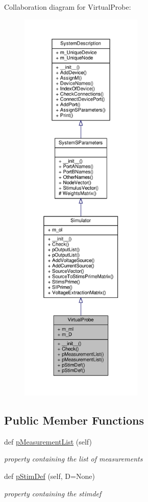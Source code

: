 Collaboration diagram for Virtual\+Probe\+:
\nopagebreak
\begin{figure}[H]
\begin{center}
\leavevmode
\includegraphics[height=550pt]{classSignalIntegrity_1_1SystemDescriptions_1_1VirtualProbe_1_1VirtualProbe__coll__graph}
\end{center}
\end{figure}
\subsection*{Public Member Functions}
\begin{DoxyCompactItemize}
\item 
def \hyperlink{classSignalIntegrity_1_1SystemDescriptions_1_1VirtualProbe_1_1VirtualProbe_af72b7ac7a9d1aa3b37f74ab894c2050d}{p\+Measurement\+List} (self)
\begin{DoxyCompactList}\small\item\em property containing the list of measurements \end{DoxyCompactList}\item 
def \hyperlink{classSignalIntegrity_1_1SystemDescriptions_1_1VirtualProbe_1_1VirtualProbe_afc6d6947dc3cd6caa0265d9ee7c4c242}{p\+Stim\+Def} (self, D=None)
\begin{DoxyCompactList}\small\item\em property containing the stimdef \end{DoxyCompactList}\end{DoxyCompactItemize}
